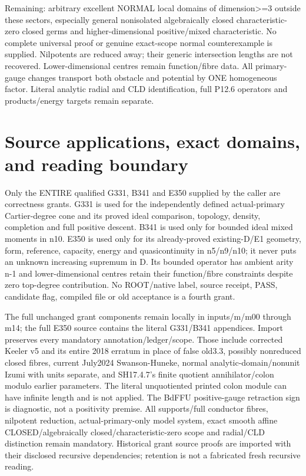 \documentclass[11pt]{article}
\begin{document}
Remaining: arbitrary excellent NORMAL local domains of dimension>=3 outside these sectors, especially general nonisolated algebraically closed characteristic-zero closed germs and higher-dimensional positive/mixed characteristic. No complete universal proof or genuine exact-scope normal counterexample is supplied. Nilpotents are reduced away; their generic intersection lengths are not recovered. Lower-dimensional centres remain function/fibre data. All primary-gauge changes transport both obstacle and potential by ONE homogeneous factor. Literal analytic radial and CLD identification, full P12.6 operators and products/energy targets remain separate.


\section*{Source applications, exact domains, and reading boundary}

Only the ENTIRE qualified G331, B341 and E350 supplied by the caller are correctness grants. G331 is used for the independently defined actual-primary Cartier-degree cone and its proved ideal comparison, topology, density, completion and full positive descent. B341 is used only for bounded ideal mixed moments in n10. E350 is used only for its already-proved existing-D/E1 geometry, form, reference, capacity, energy and quasicontinuity in n5/n9/n10; it never puts an unknown increasing supremum in D. Its bounded operator has ambient arity n-1 and lower-dimensional centres retain their function/fibre constraints despite zero top-degree contribution. No ROOT/native label, source receipt, PASS, candidate flag, compiled file or old acceptance is a fourth grant.

The full unchanged grant components remain locally in inputs/m/m00 through m14; the full E350 source contains the literal G331/B341 appendices. Import preserves every mandatory annotation/ledger/scope. Those include corrected Keeler v5 and its entire 2018 erratum in place of false old3.3, possibly nonreduced closed fibres, current July2024 Swanson-Huneke, normal analytic-domain/nonunit Izumi with units separate, and SH17.4.7's finite quotient annihilator/colon modulo earlier parameters. The literal unquotiented printed colon module can have infinite length and is not applied. The BdFFU positive-gauge retraction sign is diagnostic, not a positivity premise. All supports/full conductor fibres, nilpotent reduction, actual-primary-only model system, exact smooth affine CLOSED/algebraically closed/characteristic-zero scope and radial/CLD distinction remain mandatory. Historical grant source proofs are imported with their disclosed recursive dependencies; retention is not a fabricated fresh recursive reading.
\end{document}
